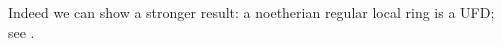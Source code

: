     \begin{remark}
        Indeed we can show a stronger result: a noetherian regular local ring is a UFD; see .
    \end{remark}



        






